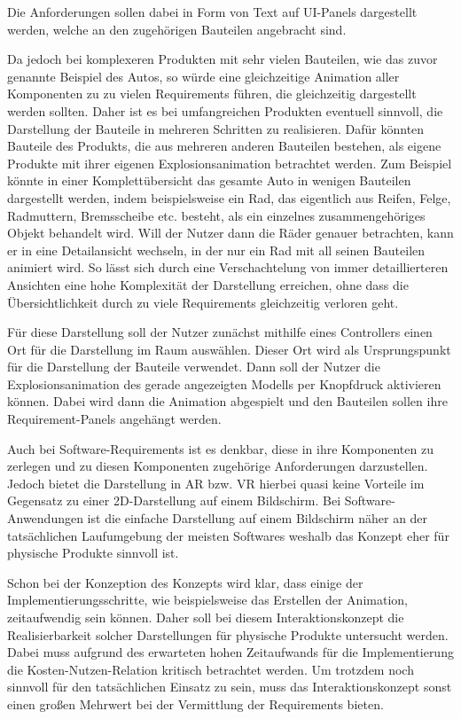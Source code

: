 Die Anforderungen sollen dabei in Form von Text auf UI-Panels dargestellt werden, welche an den zugehörigen Bauteilen angebracht sind.

Da jedoch bei komplexeren Produkten mit sehr vielen Bauteilen, wie das zuvor genannte Beispiel des Autos, so würde eine gleichzeitige Animation aller Komponenten zu zu vielen Requirements führen, die gleichzeitig dargestellt werden sollten.
Daher ist es bei umfangreichen Produkten eventuell sinnvoll, die Darstellung der Bauteile in mehreren Schritten zu realisieren.
Dafür könnten Bauteile des Produkts, die aus mehreren anderen Bauteilen bestehen, als eigene Produkte mit ihrer eigenen Explosionsanimation betrachtet werden.
Zum Beispiel könnte in einer Komplettübersicht das gesamte Auto in wenigen Bauteilen dargestellt werden, indem beispielsweise ein Rad, das eigentlich aus Reifen, Felge, Radmuttern, Bremsscheibe etc. besteht, als ein einzelnes zusammengehöriges Objekt behandelt wird.
Will der Nutzer dann die Räder genauer betrachten, kann er in eine Detailansicht wechseln, in der nur ein Rad mit all seinen Bauteilen animiert wird.
So lässt sich durch eine Verschachtelung von immer detaillierteren Ansichten eine hohe Komplexität der Darstellung erreichen, ohne dass die Übersichtlichkeit durch zu viele Requirements gleichzeitig verloren geht.


Für diese Darstellung soll der Nutzer zunächst mithilfe eines Controllers einen Ort für die Darstellung im Raum auswählen.
Dieser Ort wird als Ursprungspunkt für die Darstellung der Bauteile verwendet.
Dann soll der Nutzer die Explosionsanimation des gerade angezeigten Modells per Knopfdruck aktivieren können.
Dabei wird dann die Animation abgespielt und den Bauteilen sollen ihre Requirement-Panels angehängt werden.

Auch bei Software-Requirements ist es denkbar, diese in ihre Komponenten zu zerlegen und zu diesen Komponenten zugehörige Anforderungen darzustellen.
Jedoch bietet die Darstellung in AR bzw. VR hierbei quasi keine Vorteile im Gegensatz zu einer 2D-Darstellung auf einem Bildschirm.
Bei Software-Anwendungen ist die einfache Darstellung auf einem Bildschirm näher an der tatsächlichen Laufumgebung der meisten Softwares weshalb das Konzept eher für physische Produkte sinnvoll ist.

Schon bei der Konzeption des Konzepts wird klar, dass einige der Implementierungsschritte, wie beispielsweise das Erstellen der Animation, zeitaufwendig sein können.
Daher soll bei diesem Interaktionskonzept die Realisierbarkeit solcher Darstellungen für physische Produkte untersucht werden.
Dabei muss aufgrund des erwarteten hohen Zeitaufwands für die Implementierung die Kosten-Nutzen-Relation kritisch betrachtet werden.
Um trotzdem noch sinnvoll für den tatsächlichen Einsatz zu sein, muss das Interaktionskonzept sonst einen großen Mehrwert bei der Vermittlung der Requirements bieten.

